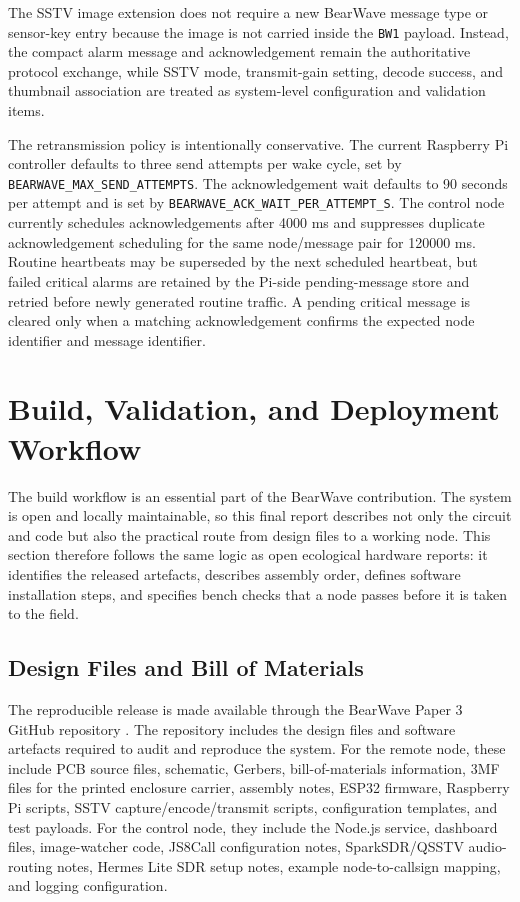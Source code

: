 \documentclass[acmsmall,screen]{acmart}
\begin{document}
The SSTV image extension does not require a new BearWave message type or sensor-key entry because the image is not carried inside the \texttt{BW1} payload. Instead, the compact alarm message and acknowledgement remain the authoritative protocol exchange, while SSTV mode, transmit-gain setting, decode success, and thumbnail association are treated as system-level configuration and validation items.

The retransmission policy is intentionally conservative. The current Raspberry Pi controller defaults to three send attempts per wake cycle, set by \texttt{BEARWAVE\_MAX\_SEND\_ATTEMPTS}. The acknowledgement wait defaults to 90 seconds per attempt and is set by \nolinkurl{BEARWAVE_ACK_WAIT_PER_ATTEMPT_S}. The control node currently schedules acknowledgements after 4000 ms and suppresses duplicate acknowledgement scheduling for the same node/message pair for 120000 ms. Routine heartbeats may be superseded by the next scheduled heartbeat, but failed critical alarms are retained by the Pi-side pending-message store and retried before newly generated routine traffic. A pending critical message is cleared only when a matching acknowledgement confirms the expected node identifier and message identifier.

\section{Build, Validation, and Deployment Workflow}
The build workflow is an essential part of the BearWave contribution. The system is open and locally maintainable, so this final report describes not only the circuit and code but also the practical route from design files to a working node. This section therefore follows the same logic as open ecological hardware reports: it identifies the released artefacts, describes assembly order, defines software installation steps, and specifies bench checks that a node passes before it is taken to the field.

\subsection{Design Files and Bill of Materials}
The reproducible release is made available through the BearWave Paper 3 GitHub repository \cite{BearWaveRepository}. The repository includes the design files and software artefacts required to audit and reproduce the system. For the remote node, these include PCB source files, schematic, Gerbers, bill-of-materials information, 3MF files for the printed enclosure carrier, assembly notes, ESP32 firmware, Raspberry Pi scripts, SSTV capture/encode/transmit scripts, configuration templates, and test payloads. For the control node, they include the Node.js service, dashboard files, image-watcher code, JS8Call configuration notes, SparkSDR/QSSTV audio-routing notes, Hermes Lite SDR setup notes, example node-to-callsign mapping, and logging configuration.
\end{document}

